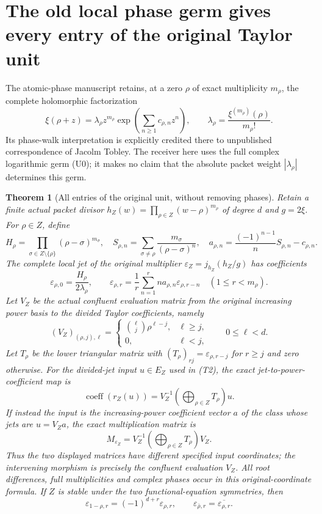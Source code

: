 \documentclass[11pt]{article}
\newtheorem{theorem}{Theorem}[section]
\begin{document}
\section{The old local phase germ gives every entry of the original Taylor unit}
The atomic-phase manuscript retains, at a zero $\rho$ of exact multiplicity
$m_\rho$, the complete holomorphic factorization
\[
 \xi(\rho+z)=\lambda_\rho z^{m_\rho}
       \exp\!\left(\sum_{n\geq1}c_{\rho,n}z^n\right),\qquad
 \lambda_\rho=\frac{\xi^{(m_\rho)}(\rho)}{m_\rho!}.
 \tag{U0}
\]
Its phase-walk interpretation is explicitly credited there to unpublished
correspondence of Jacolm Tobley. The receiver here uses the full complex
logarithmic germ (U0); it makes no claim that the absolute packet weight
$|\lambda_\rho|$ determines this germ.

\begin{theorem}[All entries of the original unit, without removing phases]
Retain a finite actual packet divisor
$h_Z(w)=\prod_{\rho\in Z}(w-\rho)^{m_\rho}$ of degree $d$ and
$g=2\xi$. For $\rho\in Z$, define
\[
 H_\rho=\prod_{\sigma\in Z\setminus\{\rho\}}(\rho-\sigma)^{m_\sigma},
 \quad S_{\rho,n}=\sum_{\sigma\ne\rho}
                    \frac{m_\sigma}{(\rho-\sigma)^n},\quad
 a_{\rho,n}=\frac{(-1)^{n-1}}nS_{\rho,n}-c_{\rho,n}.
\]
The complete local jet of the original multiplier
$\varepsilon_Z=j_{h_Z}(h_Z/g)$ has coefficients
\[
 \varepsilon_{\rho,0}=\frac{H_\rho}{2\lambda_\rho},\qquad
 \varepsilon_{\rho,r}=\frac1r\sum_{n=1}^r
                  n a_{\rho,n}\varepsilon_{\rho,r-n}
       \quad(1\leq r<m_\rho).\tag{U1}
\]
Let $V_Z$ be the actual confluent evaluation matrix from the original
increasing power basis to the divided Taylor coefficients, namely
\[
 (V_Z)_{(\rho,j),\ell}=
 \begin{cases}\binom\ell j\rho^{\ell-j},&\ell\geq j,\\0,&\ell<j,
 \end{cases}
 \qquad 0\leq\ell<d.
\]
Let $T_\rho$ be the lower triangular matrix with
$(T_\rho)_{rj}=\varepsilon_{\rho,r-j}$ for $r\geq j$ and zero
otherwise. For the divided-jet input $u\in E_Z$ used in (T2), the exact
jet-to-power-coefficient map is
\[
 \operatorname{coeff}(r_Z(u))
   =V_Z^{-1}\!\left(\bigoplus_{\rho\in Z}T_\rho\right)u.
\]
If instead the input is the increasing-power coefficient vector $a$ of
the class whose jets are $u=V_Za$, the exact multiplication matrix is
\[
 \boxed{\quad M_{\varepsilon_Z}
     =V_Z^{-1}\!\left(\bigoplus_{\rho\in Z}T_\rho\right)V_Z.\quad}
 \tag{U2}
\]
Thus the two displayed matrices have different specified input coordinates;
the intervening morphism is precisely the confluent evaluation $V_Z$.
All root differences, full multiplicities and complex phases occur in
this original-coordinate formula. If $Z$ is stable under the two
functional-equation symmetries, then
\[
 \varepsilon_{1-\rho,r}=(-1)^{d+r}\varepsilon_{\rho,r},
 \qquad \varepsilon_{\bar\rho,r}=
                         \overline{\varepsilon_{\rho,r}}.\tag{U3}
\]
\end{theorem}
\end{document}
